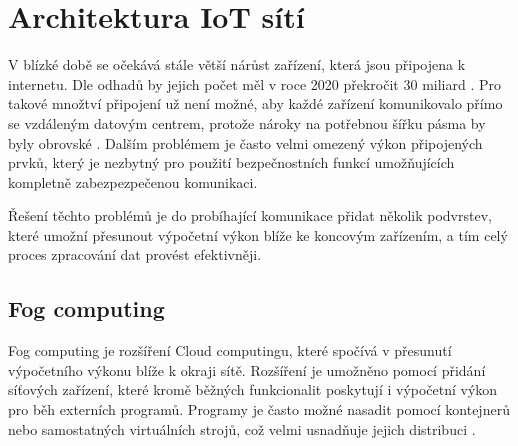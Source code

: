 \section{Architektura IoT sítí}
  V blízké době se očekává stále větší nárůst zařízení, která jsou připojena k internetu.
  Dle odhadů by jejich počet měl v roce 2020 překročit 30 miliard \cite{iotDevices}.
  Pro takové množtví připojení už není možné, aby každé zařízení komunikovalo přímo
  se vzdáleným datovým centrem, protože nároky na potřebnou šířku pásma by byly 
  obrovské \cite{fog}.
  Dalším problémem je často velmi omezený výkon připojených prvků, který je nezbytný pro 
  použití bezpečnostních funkcí umožňujících kompletně zabezpezpečenou komunikaci. 
  
  Řešení těchto problémů je do probíhající komunikace přidat několik podvrstev, 
  které umožní přesunout výpočetní výkon blíže ke koncovým zařízením, a tím celý
  proces zpracování dat provést efektivněji.
 \subsection{Fog computing} 
 Fog computing je rozšíření Cloud computingu, které spočívá v přesunutí výpočetního
 výkonu blíže k okraji sítě. Rozšíření je umožněno pomocí přidání síťových zařízení,
 které kromě běžných funkcionalit poskytují i výpočetní výkon pro běh externích programů. Programy 
 je často možné nasadit pomocí kontejnerů nebo samostatných virtuálních strojů, což 
 velmi usnadňuje jejich distribuci \cite{fog}.
 
